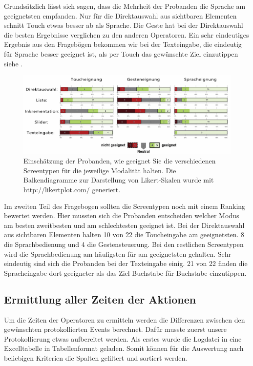 Grundsätzlich lässt sich sagen, dass die Mehrheit der Probanden die Sprache am geeignetsten empfanden. Nur für die Direktauswahl aus sichtbaren Elementen schnitt Touch etwas besser ab als Sprache. Die Geste hat bei der Direktauswahl die besten Ergebnisse verglichen zu den anderen Operatoren. Ein sehr eindeutiges Ergebnis aus den Fragebögen bekommen wir bei der Texteingabe, die eindeutig für Sprache besser geeignet ist, als per Touch das gewünschte Ziel einzutippen siehe .
\begin{figure}[ht]
  \centering
  \includegraphics[width=1\textwidth]{img/Uebersicht_Eignung}
  \caption[Eignung des Screentypen]{Einschätzung der Probanden, wie geeignet Sie die verschiedenen Screentypen für die jeweilige Modalität halten. Die Balkendiagramme zur Darstellung von Likert-Skalen wurde mit http://likertplot.com/ generiert.}
  \label{fig:Uebersicht_Eignung}
\end{figure}

Im zweiten Teil des Fragebogen sollten die Screentypen noch mit einem Ranking bewertet werden. Hier mussten sich die Probanden entscheiden welcher Modus am besten zweitbesten und am schlechtesten geeignet ist. Bei der Direktauswahl aus sichtbaren Elementen halten 10 von 22 die Toucheingabe am geeignetsten. 8 die Sprachbedienung und 4 die Gestensteuerung. Bei den restlichen Screentypen wird die Sprachbedienung am häufigsten für am geeignetsten gehalten. Sehr eindeutig sind sich die Probanden bei der Texteingabe einig. 21 von 22 finden die Spracheingabe dort geeigneter als das Ziel Buchstabe für Buchstabe einzutippen.

\subsection[Ermittlung der Zeiten der Aktionen]{Ermittlung aller Zeiten der Aktionen}
Um die Zeiten der Operatoren zu ermitteln werden die Differenzen zwischen den gewünschten protokollierten Events berechnet. Dafür musste zuerst unsere Protokollierung etwas aufbereitet werden. Als erstes wurde die Logdatei in eine Excelltabelle in Tabellenformat geladen. Somit können für die Auswertung nach beliebigen Kriterien die Spalten gefiltert und sortiert werden. 

